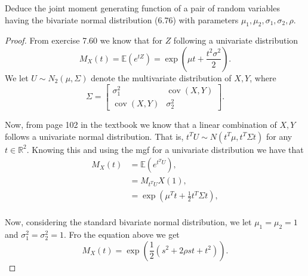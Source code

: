 \documentclass{article}
\newcommand{\R}{\mathbb{R}}
\newcommand{\E}[1]{\mathbb{E}(#1)}
\DeclareMathOperator{\cov}{cov}
\begin{document}
Deduce the joint moment generating function of a pair of random variables
having the bivariate normal distribution (6.76) with parameters
$\mu_1, \mu_2, \sigma_1, \sigma_2, \rho$.

\begin{proof}
    From exercise 7.60 we know that for $Z$ following a univariate distribution
    \begin{equation*}
        M_X(t) = \E{e^{tZ}} = \exp\left(\mu t + \frac{t^2\sigma^2}{2}\right).
    \end{equation*}
    We let $U \sim N_2(\mu, \Sigma)$ denote the multivariate distribution
    of $X,Y$, where
    \begin{equation*}
        \Sigma = \begin{bmatrix}
            \sigma_1^2 & \cov(X,Y)  \\
            \cov(X,Y)  & \sigma_2^2
        \end{bmatrix}.
    \end{equation*}

    Now, from page 102 in the textbook we know that a linear combination
    of $X,Y$ follows a univariate normal distribution. That is,
    $t^T U \sim N(t^T\mu, t^T\Sigma t)$ for any $t \in \R^2$. Knowing
    this and using the mgf for a univariate distribution we have that
    \begin{align*}
        M_X(t) & = \E{e^{t^T U}},                                     \\
               & = M_{t^T U}X (1),                                    \\
               & = \exp\left(\mu^T t + \frac{1}{2}t^T\Sigma t\right), \\
    \end{align*}

    Now, considering the standard bivariate normal distribution, we let
    $\mu_1 = \mu_2 = 1$ and $\sigma_1^2 = \sigma_2^2 = 1$. Fro the equation
    above we get
    \begin{equation*}
        M_X(t) = \exp\left(\frac{1}{2}(s^2 + 2\rho st + t^2)\right).
    \end{equation*}

\end{proof}
\end{document}
